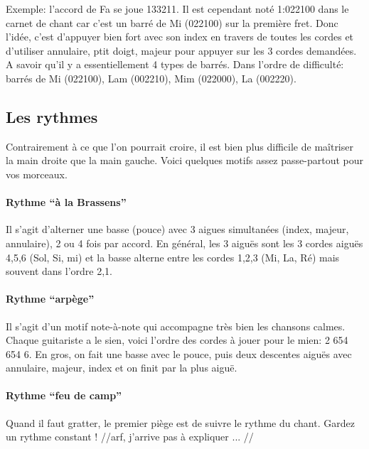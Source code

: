 \documentclass[a4paper,twoside]{article}
\begin{document}
Exemple: l'accord de Fa se joue 133211. Il est cependant noté 1:022100
dans le carnet de chant car c'est un barré de Mi (022100) sur la
première fret.  Donc l'idée, c'est d'appuyer bien fort avec son index
en travers de toutes les cordes et d'utiliser annulaire, ptit doigt,
majeur pour appuyer sur les 3 cordes demandées. A savoir qu'il y a
essentiellement 4 types de barrés.  Dans l'ordre de difficulté: barrés
de Mi (022100), Lam (002210), Mim (022000), La (002220).

\subsection{Les rythmes}

Contrairement à ce que l'on pourrait croire, il est bien plus
difficile de maîtriser la main droite que la main gauche.
Voici quelques motifs assez passe-partout pour vos morceaux.

\paragraph{Rythme ``à la Brassens''} Il s'agit d'alterner une basse (pouce)
avec 3 aigues simultanées (index, majeur, annulaire), 2 ou 4 fois par
accord. En général, les 3 aiguës sont les 3 cordes aiguës 4,5,6 (Sol,
Si, mi) et la basse alterne entre les cordes 1,2,3 (Mi, La, Ré) mais
souvent dans l'ordre 2,1.

\paragraph{Rythme ``arpège''} Il s'agit d'un motif note-à-note qui
accompagne très bien les chansons calmes. Chaque guitariste a le
sien, voici l'ordre des cordes à jouer pour le mien: 2 654 654 6. En
gros, on fait une basse avec le pouce, puis deux descentes aiguës avec
annulaire, majeur, index et on finit par la plus aiguë.

\paragraph{Rythme ``feu de camp''} Quand il faut gratter, le premier
piège est de suivre le rythme du chant. Gardez un rythme constant !
//arf, j'arrive pas à expliquer ... //


\end{document}
